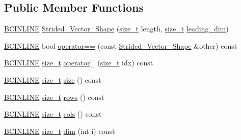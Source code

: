 \subsection*{Public Member Functions}
\begin{DoxyCompactItemize}
\item 
\hyperlink{common_8h_a6699e8b0449da5c0fafb878e59c1d4b1}{B\+C\+I\+N\+L\+I\+NE} \hyperlink{structbc_1_1Strided__Vector__Shape_a84a2a4bed5a6303eb63332e2223702a0}{Strided\+\_\+\+Vector\+\_\+\+Shape} (\hyperlink{namespacebc_aaf8e3fbf99b04b1b57c4f80c6f55d3c5}{size\+\_\+t} length, \hyperlink{namespacebc_aaf8e3fbf99b04b1b57c4f80c6f55d3c5}{size\+\_\+t} \hyperlink{structbc_1_1Strided__Vector__Shape_a382394b699656e51133998678cede6be}{leading\+\_\+dim})
\item 
\hyperlink{common_8h_a6699e8b0449da5c0fafb878e59c1d4b1}{B\+C\+I\+N\+L\+I\+NE} bool \hyperlink{structbc_1_1Strided__Vector__Shape_a9e6307c2a835653c169774a72b526df8}{operator==} (const \hyperlink{structbc_1_1Strided__Vector__Shape}{Strided\+\_\+\+Vector\+\_\+\+Shape} \&other) const
\item 
\hyperlink{common_8h_a6699e8b0449da5c0fafb878e59c1d4b1}{B\+C\+I\+N\+L\+I\+NE} \hyperlink{namespacebc_aaf8e3fbf99b04b1b57c4f80c6f55d3c5}{size\+\_\+t} \hyperlink{structbc_1_1Strided__Vector__Shape_a3a2580a96553ea02887e81e0afcca9b3}{operator\mbox{[}$\,$\mbox{]}} (\hyperlink{namespacebc_aaf8e3fbf99b04b1b57c4f80c6f55d3c5}{size\+\_\+t} idx) const
\item 
\hyperlink{common_8h_a6699e8b0449da5c0fafb878e59c1d4b1}{B\+C\+I\+N\+L\+I\+NE} \hyperlink{namespacebc_aaf8e3fbf99b04b1b57c4f80c6f55d3c5}{size\+\_\+t} \hyperlink{structbc_1_1Strided__Vector__Shape_ac7287aab62a274724e01bc60e47d1136}{size} () const
\item 
\hyperlink{common_8h_a6699e8b0449da5c0fafb878e59c1d4b1}{B\+C\+I\+N\+L\+I\+NE} \hyperlink{namespacebc_aaf8e3fbf99b04b1b57c4f80c6f55d3c5}{size\+\_\+t} \hyperlink{structbc_1_1Strided__Vector__Shape_a54bf2b0dd9e4355260f9983abd03031b}{rows} () const
\item 
\hyperlink{common_8h_a6699e8b0449da5c0fafb878e59c1d4b1}{B\+C\+I\+N\+L\+I\+NE} \hyperlink{namespacebc_aaf8e3fbf99b04b1b57c4f80c6f55d3c5}{size\+\_\+t} \hyperlink{structbc_1_1Strided__Vector__Shape_ace499a1da27a005b036a0cb8e5a43b4e}{cols} () const
\item 
\hyperlink{common_8h_a6699e8b0449da5c0fafb878e59c1d4b1}{B\+C\+I\+N\+L\+I\+NE} \hyperlink{namespacebc_aaf8e3fbf99b04b1b57c4f80c6f55d3c5}{size\+\_\+t} \hyperlink{structbc_1_1Strided__Vector__Shape_a41c14bb6b38e3f5f4f9d635d87196602}{dim} (int i) const

\end{DoxyCompactItemize}
